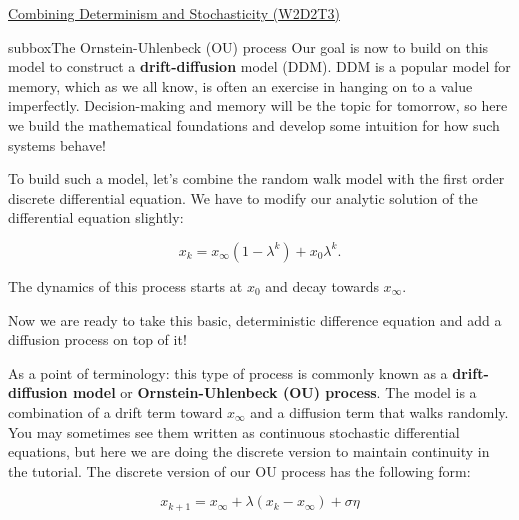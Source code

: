\begin{textbox}{\href{https://compneuro.neuromatch.io/tutorials/W2D2_LinearSystems/student/W2D2_Tutorial3.html}{Combining Determinism and Stochasticity (W2D2T3)} }

\begin{subbox}{subbox}{The Ornstein-Uhlenbeck (OU) process}
\scriptsize
Our goal is now to build on this model to construct a \textbf{drift-diffusion} model (DDM). DDM is a popular model for memory, which as we all know, is often an exercise in hanging on to a value imperfectly. Decision-making and memory will be the topic for tomorrow, so here we build the mathematical foundations and develop some intuition for how such systems behave!

To build such a model, let's combine the random walk model with the first order discrete differential equation. We have to modify our analytic solution of the differential equation slightly:

\[x_k = x_\infty(1 - \lambda^k) + x_0 \lambda^k.\]

The dynamics of this process starts at $x_0$ and decay towards $x_{\infty}.$

Now we are ready to take this basic, deterministic difference equation and add a diffusion process on top of it!

As a point of terminology: this type of process is commonly known as a \textbf{drift-diffusion model} or \textbf{Ornstein-Uhlenbeck (OU) process}. The model is a combination of a drift term toward $x_{\infty}$ and a diffusion term that walks randomly. You may sometimes see them written as continuous stochastic differential equations, but here we are doing the discrete version to maintain continuity in the tutorial. The discrete version of our OU process has the following form:

\[x_{k+1} = x_\infty + \lambda(x_k - x_{\infty}) + \sigma \eta\]


\end{subbox}
\end{textbox}
